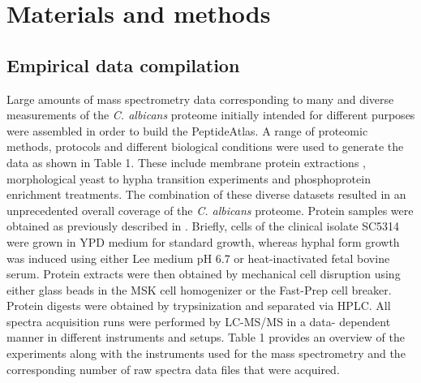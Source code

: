 \section*{Materials and methods}

\subsection*{Empirical data compilation}

Large amounts of mass spectrometry data corresponding to
many and diverse measurements of the \textit{C. albicans} proteome
initially intended for different purposes were assembled in order
to build the PeptideAtlas. A range of proteomic methods,
protocols and different biological conditions were used to
generate the data as shown in Table 1. These include membrane
protein extractions \citep{Cabezon2009}, morphological yeast to hypha transition
experiments \citep{Monteoliva2010} and phosphoprotein enrichment treatments.
The combination of these diverse datasets resulted in an
unprecedented overall coverage of the \textit{C. albicans} proteome.
Protein samples were obtained as previously described in \citep{Monteoliva2010}.
Briefly, cells of the clinical isolate SC5314 were grown in YPD
medium for standard growth, whereas hyphal form growth was
induced using either Lee medium pH 6.7 or heat-inactivated
fetal bovine serum. Protein extracts were then obtained by
mechanical cell disruption using either glass beads in the MSK
cell homogenizer or the Fast-Prep cell breaker. Protein digests
were obtained by trypsinization and separated via HPLC. All
spectra acquisition runs were performed by LC-MS/MS in a data-
dependent manner in different instruments and setups. Table 1
provides an overview of the experiments along with the
instruments used for the mass spectrometry and the corresponding
 number of raw spectra data files that were acquired.
 


